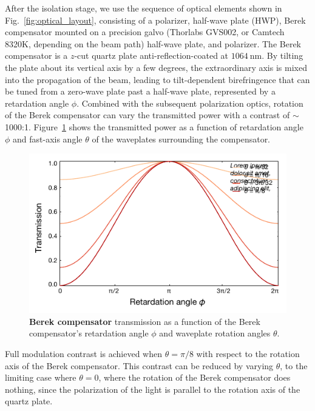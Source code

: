 \documentclass[twocolumn,aps,pra,showpacs,preprintnumbers,bibnotes]{revtex4-1}
\newcommand\unit[2]{\ensuremath{#1~\mathrm{{#2}}}}
\begin{document}
After the isolation stage, we use the sequence of optical elements shown in Fig.~\ref{fig:optical_layout}, consisting of a polarizer, half-wave plate (HWP), Berek compensator mounted on a precision galvo (Thorlabs GVS002, or Camtech 8320K, depending on the beam path) half-wave plate, and polarizer.
The Berek compensator is a $z$-cut quartz plate anti-reflection-coated at \unit{1064}{nm}.
By tilting the plate about its vertical axis by a few degrees, the extraordinary axis is mixed into the propagation of the beam, leading to  tilt-dependent birefringence that can be tuned from a zero-wave plate past a half-wave plate, represented by a retardation angle $\phi$.
Combined with the subsequent polarization optics, rotation of the Berek compensator can vary the transmitted power with a contrast of $\sim$1000:1.
Figure~\ref{fig:berek} shows the transmitted power as a function of retardation angle $\phi$ and fast-axis angle $\theta$ of the waveplates surrounding the compensator.
\begin{figure}
  \begin{center}
    \includegraphics{Figure4.pdf}
    \caption{\textbf{Berek compensator} transmission as a function of the Berek compensator's retardation angle $\phi$ and waveplate rotation angles $\theta$.}
    \label{fig:berek}
  \end{center}
\end{figure}

Full modulation contrast is achieved when $\theta=\pi/8$ with respect to the rotation axis of the Berek compensator.
This contrast can be reduced by varying $\theta$, to the limiting case where $\theta=0$, where the rotation of the Berek compensator does nothing, since the polarization of the light is parallel to the rotation axis of the quartz plate.
\end{document}
